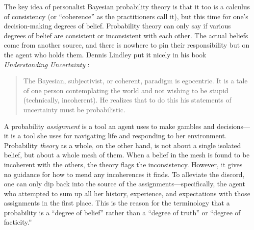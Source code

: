 \documentclass[aps,pra,superscriptaddress,10pt,tightenlines,twocolumn,nofootinbib]{revtex4}
\begin{document}
The key idea of personalist Bayesian probability theory is that it too is a calculus of consistency (or ``coherence'' as the practitioners call it), but this time for one's decision-making degrees of belief.  Probability theory can only say if various degrees of belief are consistent or inconsistent with each other. The actual beliefs come from another source, and there is nowhere to pin their responsibility but on the agent who holds them.  Dennis Lindley put it nicely in his book {\sl Understanding Uncertainty\/} \cite{Lindley06}:
\begin{quote}
The Bayesian, subjectivist, or coherent, para\-digm is egocentric. It is a tale of one person contemplating the world and not wishing to be stupid (technically, incoherent). He realizes that to do this his statements of uncertainty must be probabilistic.
\end{quote}
A probability {\it assignment\/} is a tool an agent uses to make gambles and decisions---it is a tool she uses for navigating life and responding to her environment.  Probability {\it theory\/} as a whole, on the other hand, is not about a single isolated belief, but about a whole mesh of them.  When a belief in the mesh is found to be incoherent with the others, the theory flags the inconsistency.  However, it gives no guidance for how to mend any incoherences it finds.  To alleviate the discord, one can only dip back into the source of the assignments---specifically, the agent who attempted to sum up all her history, experience, and expectations with those assignments in the first place.  This is the reason for the terminology that a probability is a ``degree of belief'' rather than a ``degree of truth'' or ``degree of facticity.''
\end{document}
